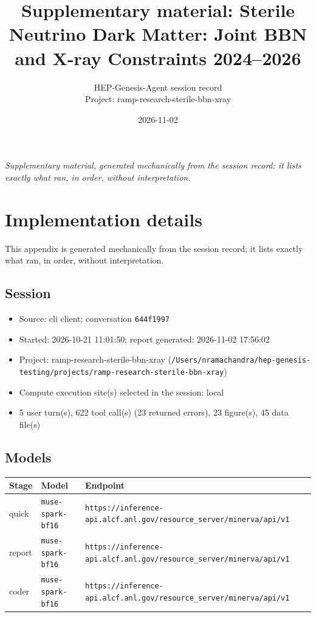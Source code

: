 \documentclass[11pt,a4paper]{article}
\title{Supplementary material: Sterile Neutrino Dark Matter: Joint BBN and X-ray Constraints 2024--2026}
\author{HEP-Genesis-Agent session record \\ \small Project: ramp-research-sterile-bbn-xray}
\date{2026-11-02}
\begin{document}
\maketitle
\noindent\textit{\small Supplementary material, generated mechanically from the session record: it lists exactly what ran, in order, without interpretation.}
\vspace{1em}



\appendix
\section{Implementation details}
\label{app:impl}
This appendix is generated mechanically from the session record; it lists exactly what ran, in order, without interpretation.
\subsection{Session}
\begin{itemize}
  \item Source: cli client; conversation \texttt{644f1997}
  \item Started: 2026-10-21 11:01:50; report generated: 2026-11-02 17:56:02
  \item Project: ramp-research-sterile-bbn-xray (\texttt{/\allowbreak{}Users/\allowbreak{}nramachandra/\allowbreak{}hep-genesis-testing/\allowbreak{}projects/\allowbreak{}ramp-research-sterile-bbn-xray})
  \item Compute execution site(s) selected in the session: local
  \item 5 user turn(s), 622 tool call(s) (23 returned errors), 23 figure(s), 45 data file(s)
\end{itemize}
\subsection{Models}
\begin{longtable}{@{}p{}p{}p{}@{}}
\toprule Stage & Model & Endpoint \\ \midrule \endhead
quick & \texttt{muse-spark-bf16} & \texttt{https:\allowbreak{}/\allowbreak{}/\allowbreak{}inference-api.alcf.anl.gov/\allowbreak{}resource\_\allowbreak{}server/\allowbreak{}minerva/\allowbreak{}api/\allowbreak{}v1} \\
report & \texttt{muse-spark-bf16} & \texttt{https:\allowbreak{}/\allowbreak{}/\allowbreak{}inference-api.alcf.anl.gov/\allowbreak{}resource\_\allowbreak{}server/\allowbreak{}minerva/\allowbreak{}api/\allowbreak{}v1} \\
coder & \texttt{muse-spark-bf16} & \texttt{https:\allowbreak{}/\allowbreak{}/\allowbreak{}inference-api.alcf.anl.gov/\allowbreak{}resource\_\allowbreak{}server/\allowbreak{}minerva/\allowbreak{}api/\allowbreak{}v1} \\
\bottomrule\end{longtable}
\end{document}

